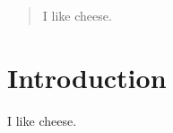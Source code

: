 \documentclass[manuscript, letterpaper]{aastex6}
\begin{document}
\begin{abstract}
I like cheese.
\end{abstract}

\section{Introduction}
I like cheese.
\end{document}
